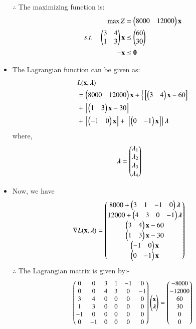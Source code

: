 \begin{itemize}
$\therefore$ The maximizing function is:
\begin{align}
        \max Z &= \begin{pmatrix}8000& 12000\end{pmatrix}\mathbf{x}\\
        s.t. \quad 
        \begin{pmatrix}3 & 4\\ 1 & 3 \end{pmatrix}\mathbf{x} &\preceq \begin{pmatrix}60\\30\end{pmatrix} \\
        \mathbf{-x} &\preceq \mathbf{0}
\end{align}
\item The Lagrangian function can be given as:
\begin{equation}
\begin{aligned}
    &L(\mathbf{x},\boldsymbol{\lambda}) \\ &= \begin{pmatrix}8000 & 12000\end{pmatrix}\mathbf{x}+\left\{{}\left[\begin{pmatrix}3 & 4\end{pmatrix}\mathbf{x}-60\right]\right. \\ &+ {}\left[\begin{pmatrix}1 & 3\end{pmatrix}\mathbf{x}-30\right] \\ &+ {}\left[\begin{pmatrix}-1 & 0\end{pmatrix}\mathbf{x}\right] +\left.{}\left[\begin{pmatrix}0 & -1\end{pmatrix}\mathbf{x}\right]\right\}\boldsymbol{\lambda}
\end{aligned}
\end{equation}
where,
\begin{align}
    \boldsymbol{\lambda} &= \begin{pmatrix}\lambda_1 \\ \lambda_2 \\ \lambda_3 \\ \lambda_4\end{pmatrix}
\end{align}
\item Now, we have
\begin{align}
    \nabla L(\mathbf{x},\boldsymbol{\lambda}) &= \begin{pmatrix}8000+ \begin{pmatrix}3 & 1 & -1 & 0 \end{pmatrix}\boldsymbol{\lambda}\\ 12000+\begin{pmatrix}4 & 3 &0 & -1\end{pmatrix}\boldsymbol{\lambda} \\ \begin{pmatrix}3 & 4\end{pmatrix}\mathbf{x}-60 \\ \begin{pmatrix}1 & 3\end{pmatrix}\mathbf{x}-30 \\ \begin{pmatrix}-1 & 0\end{pmatrix}\mathbf{x} \\ \begin{pmatrix}0 & -1\end{pmatrix}\mathbf{x}\end{pmatrix}
\end{align}
$\therefore$ The Lagrangian matrix is given by:-
\begin{align}
  \small{\myvec{0 & 0 & 3 & 1 & -1 & 0 \\ 0 & 0 & 4 & 3 &0 & -1 \\ 3 & 4 & 0 & 0 & 0 & 0 \\ 1 & 3 & 0 & 0 & 0 & 0 \\ -1 & 0 & 0 & 0 & 0 & 0 \\ 0 & -1 & 0 & 0 & 0 & 0 }\myvec{\vec{x} \\ \boldsymbol{\lambda} }}= \small{\myvec{-8000 \\ -12000 \\ 60 \\ 30 \\ 0 \\0 }}

\end{align}
\end{itemize}
